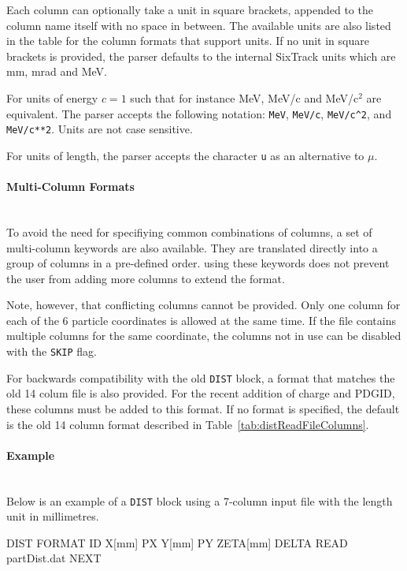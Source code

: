 Each column can optionally take a unit in square brackets, appended to the column name itself with no space in between.
The available units are also listed in the table for the column formats that support units.
If no unit in square brackets is provided, the parser defaults to the internal SixTrack units which are mm, mrad and MeV.

For units of energy $c=1$ such that for instance MeV, MeV/c and MeV/c$^2$ are equivalent.
The parser accepts the following notation: \texttt{MeV}, \texttt{MeV/c}, \texttt{MeV/c\^{}2}, and \texttt{MeV/c**2}.
Units are not case sensitive.

For units of length, the parser accepts the character \texttt{u} as an alternative to $\mu$.

\paragraph{Multi-Column Formats}~\\

To avoid the need for specifiying common combinations of columns, a set of multi-column keywords are also available.
They are translated directly into a group of columns in a pre-defined order.
using these keywords does not prevent the user from adding more columns to extend the format.

Note, however, that conflicting columns cannot be provided.
Only one column for each of the 6 particle coordinates is allowed at the same time.
If the file contains multiple columns for the same coordinate, the columns not in use can be disabled with the \texttt{SKIP} flag.

For backwards compatibility with the old \texttt{DIST} block, a format that matches the old 14 colum file is also provided.
For the recent addition of charge and PDGID, these columns must be added to this format.
If no format is specified, the default is the old 14 column format described in Table~\ref{tab:distReadFileColumns}.

\paragraph{Example}~\\

Below is an example of a \texttt{DIST} block using a 7-column input file with the length unit in millimetres.

\begin{cverbatim}
DIST
  FORMAT ID X[mm] PX Y[mm] PY ZETA[mm] DELTA
  READ   partDist.dat
NEXT
\end{cverbatim}

